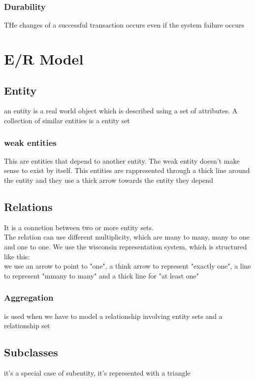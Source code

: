 \documentclass[12pt, a4paper]{article}
\begin{document}
\subsubsection{Durability}
THe changes of a successful transaction occurs even if the system failure occurs

\newpage
\section{E/R Model}

\subsection{Entity}
an entity is a real world object which is described using a set of attributes. A collection of similar
entities is a entity set

\subsubsection*{weak entities}
This are entities that depend to another entity. The weak entity doesn't make sense to exist by itself. 
This entities are rappresented through a thick line around the entity and they use a thick arrow towards
the entity they depend

\subsection{Relations}
It is a connetion between two or more entity sets. \\The relation can use different multiplicity, which
are many to many, many to one and one to one. We use the wisconsin representation system, which is 
structured like this:\\ we use an arrow to point to "one", a think arrow to represent "exactly one", a 
line to represent "mmany to many" and a thick line for "at least one"

\subsubsection{Aggregation}
is used when we have to model a relationship involving entity sets and a relationship set

\subsection{Subclasses}
it's a special case of subentity, it's represented with a triangle
\end{document}
